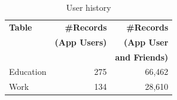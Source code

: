\begin{table}
\centering
\caption{\small User history}
\label{tab:history}
\begin{tabular}{|>{\small}p{2cm}|>{\small}r|>{\small}r|}
\hline
\textbf{Table} & \textbf{\#Records} & \textbf{\#Records} \\
& \textbf{(App Users)} & \textbf{(App User} \\
& & \textbf{and Friends)} \\
\hline
Education & 275 & 66,462 \\
\hline
Work & 134 & 28,610 \\
\hline
\end{tabular}
\end{table}






